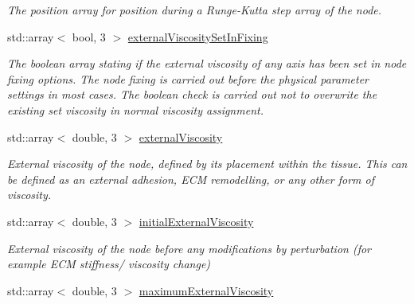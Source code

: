 \begin{DoxyCompactItemize}
\begin{DoxyCompactList}\small\item\em The position array for position during a Runge-\/\+Kutta step array of the node. \end{DoxyCompactList}\item 
\hypertarget{classNode_a6c133172953bbe1451075ef7b78db6b7}{}std\+::array$<$ bool, 3 $>$ \hyperlink{classNode_a6c133172953bbe1451075ef7b78db6b7}{external\+Viscosity\+Set\+In\+Fixing}\label{classNode_a6c133172953bbe1451075ef7b78db6b7}

\begin{DoxyCompactList}\small\item\em The boolean array stating if the external viscosity of any axis has been set in node fixing options. The node fixing is carried out before the physical parameter settings in most cases. The boolean check is carried out not to overwrite the existing set viscosity in normal viscosity assignment. \end{DoxyCompactList}\item 
\hypertarget{classNode_a6377f135c12aae0dd776107c2628516e}{}std\+::array$<$ double, 3 $>$ \hyperlink{classNode_a6377f135c12aae0dd776107c2628516e}{external\+Viscosity}\label{classNode_a6377f135c12aae0dd776107c2628516e}

\begin{DoxyCompactList}\small\item\em External viscosity of the node, defined by its placement within the tissue. This can be defined as an external adhesion, E\+C\+M remodelling, or any other form of viscosity. \end{DoxyCompactList}\item 
\hypertarget{classNode_a1d6adc185162f9fea733839c4e7230f7}{}std\+::array$<$ double, 3 $>$ \hyperlink{classNode_a1d6adc185162f9fea733839c4e7230f7}{initial\+External\+Viscosity}\label{classNode_a1d6adc185162f9fea733839c4e7230f7}

\begin{DoxyCompactList}\small\item\em External viscosity of the node before any modifications by perturbation (for example E\+C\+M stiffness/ viscosity change) \end{DoxyCompactList}\item 
\hypertarget{classNode_a78523720b4a1758f38d4e8b1703ad6c3}{}std\+::array$<$ double, 3 $>$ \hyperlink{classNode_a78523720b4a1758f38d4e8b1703ad6c3}{maximum\+External\+Viscosity}\label{classNode_a78523720b4a1758f38d4e8b1703ad6c3}


\end{DoxyCompactItemize}
